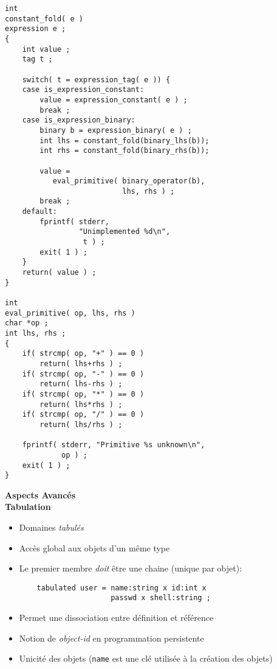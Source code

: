 \documentclass[11pt]{article}
\begin{document}
{\newpage

\vskip 2cm

\begin{verbatim}
int
constant_fold( e )
expression e ;
{
    int value ;
    tag t ;

    switch( t = expression_tag( e )) {
    case is_expression_constant:
        value = expression_constant( e ) ;      
        break ;
    case is_expression_binary:
        binary b = expression_binary( e ) ;
        int lhs = constant_fold(binary_lhs(b));
        int rhs = constant_fold(binary_rhs(b));

        value = 
           eval_primitive( binary_operator(b), 
                           lhs, rhs ) ;
        break ;
    default:
        fprintf( stderr, 
                 "Unimplemented %d\n",
                  t ) ;
        exit( 1 ) ;
    }
    return( value ) ;
}

int
eval_primitive( op, lhs, rhs )
char *op ;
int lhs, rhs ;
{
    if( strcmp( op, "+" ) == 0 ) 
        return( lhs+rhs ) ;
    if( strcmp( op, "-" ) == 0 ) 
        return( lhs-rhs ) ;
    if( strcmp( op, "*" ) == 0 )
        return( lhs*rhs ) ;
    if( strcmp( op, "/" ) == 0 )
        return( lhs/rhs ) ;

    fprintf( stderr, "Primitive %s unknown\n", 
             op ) ;
    exit( 1 ) ;
}
\end{verbatim}

\newpage

\begin{center}
{\huge\bf Aspects Avancés \\
Tabulation}
\end{center}

\vskip 2cm

\begin{itemize}
\item Domaines {\em tabulés}
\item Accès global aux objets d'un même type
\item Le premier membre {\em doit} être une chaine (unique par objet):

\begin{verbatim}
    tabulated user = name:string x id:int x 
                     passwd x shell:string ;
\end{verbatim}
\item Permet une dissociation entre définition et référence
\item Notion de {\em object-id} en programmation persistente
\item Unicité des objets ({\tt name} est une clé utilisée à la
création des objets)
\end{itemize}

}
\end{document}
